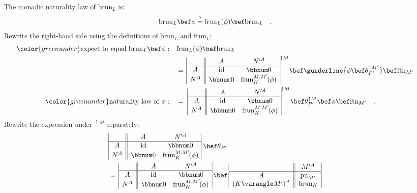The monadic naturality law of $\text{brun}_{L}$ is:
\[
\text{brun}_{L}\bef\phi\overset{?}{=}\text{frun}_{L}(\phi)\bef\text{brun}_{L}\quad.
\]
Rewrite the right-hand side using the definitions of $\text{brun}_{L}$
and $\text{frun}_{L}$:
\begin{align*}
{\color{greenunder}\text{expect to equal }\text{brun}_{L}\bef\phi:}\quad & \text{frun}_{L}(\phi)\bef\text{brun}_{L}\\
 & =\,\begin{array}{|c||cc|}
 & A & N^{\prime A}\\
\hline A & \text{id} & \bbnum 0\\
N^{A} & \bbnum 0 & \text{frun}_{K}^{M,M^{\prime}}\!(\phi)
\end{array}^{\uparrow M}\bef\gunderline{\phi\bef\theta_{P^{\prime}}^{\uparrow M^{\prime}}}\bef\text{ftn}_{M^{\prime}}\\
{\color{greenunder}\text{naturality law of }\phi:}\quad & =\,\,\begin{array}{|c||cc|}
 & A & N^{\prime A}\\
\hline A & \text{id} & \bbnum 0\\
N^{A} & \bbnum 0 & \text{frun}_{K}^{M,M^{\prime}}\!(\phi)
\end{array}^{\uparrow M}\bef\theta_{P^{\prime}}^{\uparrow M}\bef\phi\bef\text{ftn}_{M^{\prime}}\quad.
\end{align*}
Rewrite the expression under $^{\uparrow M}$ separately:
\begin{align*}
 & \begin{array}{|c||cc|}
 & A & N^{\prime A}\\
\hline A & \text{id} & \bbnum 0\\
N^{A} & \bbnum 0 & \text{frun}_{K}^{M,M^{\prime}}\!(\phi)
\end{array}\,\bef\theta_{P^{\prime}}\\
 & =\,\begin{array}{|c||cc|}
 & A & N^{\prime A}\\
\hline A & \text{id} & \bbnum 0\\
N^{A} & \bbnum 0 & \text{frun}_{K}^{M,M^{\prime}}\!(\phi)
\end{array}\,\bef\,\begin{array}{|c||c|}
 & M^{\prime A}\\
\hline A & \text{pu}_{M^{\prime}}\\
(K\varangle M^{\prime})^{A} & \text{brun}_{K}
\end{array}\,
\end{align*}
